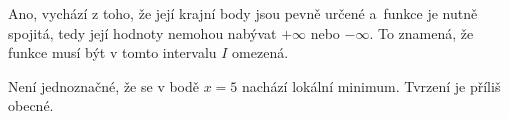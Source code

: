 
\begin{tcolorbox}[title=1. otázka]
    Ano, vychází z toho, že její krajní body jsou pevně určené 
    a~funkce je nutně spojitá, tedy její hodnoty nemohou 
    nabývat $+\infty$ nebo $-\infty$.
    To znamená, že funkce musí být v tomto intervalu $I$ omezená.
\end{tcolorbox}

\begin{tcolorbox}
    Není jednoznačné, že se v bodě $x = 5$ nachází lokální minimum.
    Tvrzení je příliš obecné.   
\end{tcolorbox}

